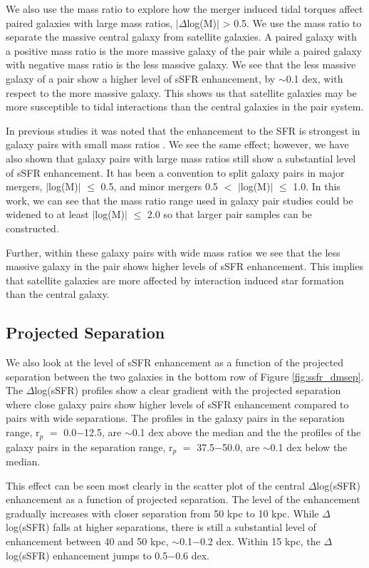 \documentclass[iop,revtex4,twocolumn,apj,numberedappendix,appendixfloats]{emulateapj}
\begin{document}
We also use the mass ratio to explore how the merger induced tidal torques affect paired galaxies with large mass ratios, $|\Delta$log(M)$|$ > 0.5. We use the mass ratio to separate the massive central galaxy from satellite galaxies. A paired galaxy with a positive mass ratio is the more massive galaxy of the pair while a paired galaxy with negative mass ratio is the less massive galaxy. We see that the less massive galaxy of a pair show a higher level of sSFR enhancement, by $\sim$0.1 dex, with respect to the more massive galaxy. This shows us that satellite galaxies may be more susceptible to tidal interactions than the central galaxies in the pair system. 

In previous studies it was noted that the enhancement to the SFR is strongest in galaxy pairs with small mass ratios \citet{Ellison:2008}. We see the same effect; however, we have also shown that galaxy pairs with large mass ratios still show a substantial level of sSFR enhancement. It has been a convention to split galaxy pairs in major mergers, $|$log(M)$|$ $\le$ 0.5, and minor mergers 0.5 $<$ $|$log(M)$|$ $\le$ 1.0. In this work, we can see that the mass ratio range used in galaxy pair studies could be widened to at least $|$log(M)$|$ $\le$ 2.0 so that larger pair samples can be constructed.  

Further, within these galaxy pairs with wide mass ratios we see that the less massive galaxy in the pair shows higher levels of sSFR enhancement. This implies that satellite galaxies are more affected by interaction induced star formation than the central galaxy. 

\subsection{Projected Separation}\label{sec:sep}

We also look at the level of sSFR enhancement as a function of the projected separation between the two galaxies in the bottom row of Figure \ref{fig:ssfr_dmsep}. The $\Delta$log(sSFR) profiles show a clear gradient with the projected separation where close galaxy pairs show higher levels of sSFR enhancement compared to pairs with wide separations. The profiles in the galaxy pairs in the separation range, r$_p$ $=$ 0.0$-$12.5, are $\sim$0.1 dex above the median and the the profiles of the galaxy pairs in the separation range, r$_p$ $=$ 37.5$-$50.0, are $\sim$0.1 dex below the median. 

This effect can be seen most clearly in the scatter plot of the central $\Delta$log(sSFR) enhancement as a function of projected separation. The level of the enhancement gradually increases with closer separation from 50 kpc to 10 kpc. While $\Delta$log(sSFR) falls at higher separations, there is still a substantial level of enhancement between 40 and 50 kpc, $\sim$0.1$-$0.2 dex. Within 15 kpc, the $\Delta$log(sSFR) enhancement jumps to 0.5$-$0.6 dex. 
\end{document}
